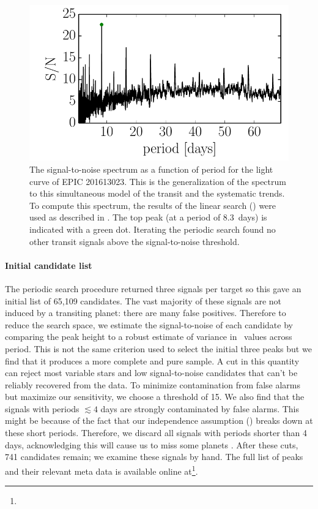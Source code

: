 \begin{figure}[p]
\begin{center}
\includegraphics{figures/ketu/periodic.pdf}
\end{center}
\caption{%
The signal-to-noise spectrum as a function of period for the light curve of
EPIC 201613023.
This is the generalization of the  spectrum \citep{Kovacs:2002}
to this simultaneous model of the transit and the systematic trends.
To compute this spectrum, the results of the linear search ()
were used as described in .
The top peak (at a period of 8.3~days) is indicated with a green dot.
Iterating the periodic search found no other transit signals above the
signal-to-noise threshold.
}
\end{figure}



\paragraph{Initial candidate list}

The periodic search procedure returned three signals per target so this gave
an initial list of 65,109 candidates.
The vast majority of these signals are not induced by a transiting planet:
there are many false positives.
Therefore to reduce the search space, we estimate the signal-to-noise of each
candidate by comparing the peak height to a robust estimate of variance in
\BIC\ values across period.
This is not the same criterion used to select the initial three peaks but we
find that it produces a more complete and pure sample.
A cut in this quantity can reject most variable stars and low signal-to-noise
candidates that can't be reliably recovered from the data.
To minimize contamination from false alarms but maximize our sensitivity, we
choose a threshold of 15.
We also find that the signals with periods $\lesssim 4$ days are strongly
contaminated by false alarms.
This might be because of the fact that our independence assumption
() breaks down at these short periods.
Therefore, we discard all signals with periods shorter than 4 days,
acknowledging this will cause us to miss some planets
\citep{Sanchis-Ojeda:2014}.
After these cuts, 741 candidates remain; we examine these signals by hand.
The full list of peaks and their relevant meta data is available online
at\footnote{\datareleaseurl}.



